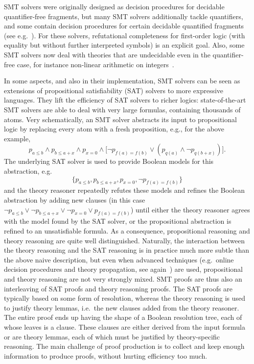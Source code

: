 \documentclass{llncs}
\begin{document}
SMT solvers were originally designed as decision procedures for
decidable quantifier-free fragments, but many SMT solvers additionally tackle
quantifiers, and some contain decision procedures for certain decidable quantified fragments
(see e.g.~\cite{Ge2}).  For these solvers, refutational completeness for first-order logic
(with equality but without further interpreted symbols) is an explicit goal.
Also, some SMT solvers now deal with theories that are undecidable even in the
quantifier-free case, for instance non-linear arithmetic on integers~\cite{Borralleras1}.

In some aspects, and also in their implementation, SMT solvers can be seen as
extensions of propositional satisfiability (SAT) solvers to more expressive
languages.  They lift the efficiency of SAT solvers to richer logics:
state-of-the-art SMT solvers are able to deal with very large formulas,
containing thousands of atoms.  Very schematically, an SMT solver abstracts its
input to propositional logic by replacing every atom with a fresh proposition,
e.g., for the above example,
\begin{displaymath}
p_{a \leq b} \wedge p_{b \leq a + x} \wedge p_{x = 0} \wedge
 \big[ \neg p_{f(a) = f(b)} \vee (p_{q(a)} \wedge \neg p_{q(b + x)}) \big].
\end{displaymath}
The underlying SAT solver is used to provide Boolean models for this
abstraction, e.g.\
\begin{displaymath}
\{ p_{a \leq b}, p_{b \leq a + x}, p_{x = 0}, \neg p_{f(a) = f(b)} \}
\end{displaymath}
and the theory reasoner repeatedly refutes these models and refines the Boolean
abstraction by adding new clauses (in this case $\neg p_{a \leq b} \vee \neg
p_{b \leq a + x} \vee \neg p_{x = 0} \vee p_{f(a) = f(b)}$) until either the
theory reasoner agrees with the model found by the SAT solver, or the
propositional abstraction is refined to an unsatisfiable formula.  As a
consequence, propositional reasoning and theory reasoning are quite well
distinguished.  Naturally, the interaction between the theory reasoning and the
SAT reasoning is in practice much more subtle than the above naive description,
but even when advanced techniques (e.g.\ online decision procedures and theory propagation, see again~\cite{Barrett14}) are used,
propositional and theory reasoning are not very strongly mixed.  SMT proofs are
thus also an interleaving of SAT proofs and theory reasoning proofs.  The SAT
proofs are typically based on some form of resolution, whereas the theory reasoning
is used to justify theory lemmas, i.e.\ the new clauses added from the theory
reasoner.
The entire proof ends up having the shape of a Boolean resolution tree, each of
whose leaves is a clause.  These clauses are either derived from the input
formula or are theory lemmas, each of which must be justified by
theory-specific reasoning.
The main challenge of proof production is to collect and keep enough information
to produce proofs, without hurting efficiency too much.
\end{document}

